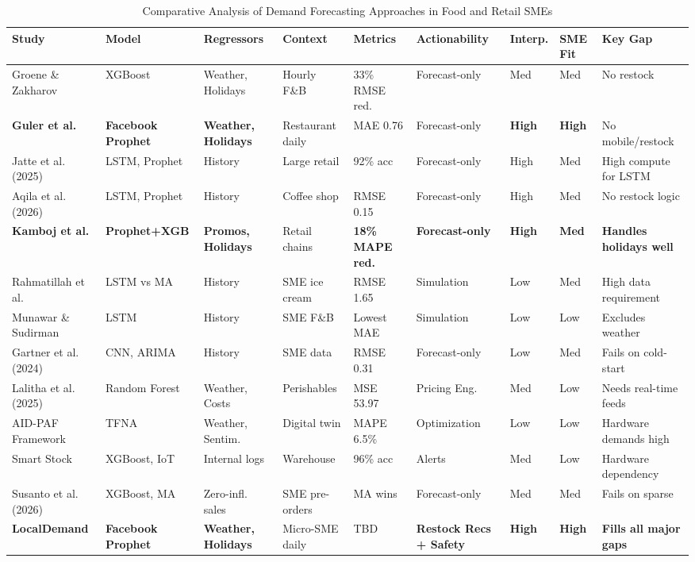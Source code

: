 \documentclass[conference]{IEEEtran}
\begin{document}
\begin{table}[t]
\centering
\footnotesize
\caption{Comparative Analysis of Demand Forecasting Approaches in Food and Retail SMEs}
\label{tab:comparative_analysis}
\begin{tabular}{@{}p{2.1cm}p{1.7cm}p{1.9cm}p{1.6cm}p{1.8cm}p{1.4cm}p{0.9cm}p{1cm}p{2.4cm}@{}}
\toprule
\textbf{Study} & \textbf{Model} & \textbf{Regressors} & \textbf{Context} & \textbf{Metrics} & \textbf{Actionability} & \textbf{Interp.} & \textbf{SME Fit} & \textbf{Key Gap} \\
\midrule
Groene \& Zakharov & XGBoost & Weather, Holidays & Hourly F\&B & 33\% RMSE red. & Forecast-only & Med & Med & No restock \\
\textbf{Guler et al.} & \textbf{Facebook Prophet} & \textbf{Weather, Holidays} & Restaurant daily & MAE 0.76 & Forecast-only & \textbf{High} & \textbf{High} & No mobile/restock \\
Jatte et al. (2025) & LSTM, Prophet & History & Large retail & 92\% acc & Forecast-only & High & Med & High compute for LSTM \\
Aqila et al. (2026) & LSTM, Prophet & History & Coffee shop & RMSE 0.15 & Forecast-only & High & Med & No restock logic \\
\textbf{Kamboj et al.} & \textbf{Prophet+XGB} & \textbf{Promos, Holidays} & Retail chains & \textbf{18\% MAPE red.} & \textbf{Forecast-only} & \textbf{High} & \textbf{Med} & \textbf{Handles holidays well} \\
Rahmatillah et al. & LSTM vs MA & History & SME ice cream & RMSE 1.65 & Simulation & Low & Med & High data requirement \\
Munawar \& Sudirman & LSTM & History & SME F\&B & Lowest MAE & Simulation & Low & Low & Excludes weather \\
Gartner et al. (2024)& CNN, ARIMA & History & SME data & RMSE 0.31 & Forecast-only & Low & Med & Fails on cold-start \\
Lalitha et al. (2025)& Random Forest & Weather, Costs & Perishables & MSE 53.97 & Pricing Eng. & Med & Low & Needs real-time feeds \\
AID-PAF Framework & TFNA & Weather, Sentim. & Digital twin & MAPE 6.5\% & Optimization & Low & Low & Hardware demands high \\
Smart Stock & XGBoost, IoT & Internal logs & Warehouse & 96\% acc & Alerts & Med & Low & Hardware dependency \\
Susanto et al. (2026)& XGBoost, MA & Zero-infl. sales & SME pre-orders & MA wins & Forecast-only & Med & Med & Fails on sparse \\
\midrule
\textbf{LocalDemand} & \textbf{Facebook Prophet} & \textbf{Weather, Holidays} & Micro-SME daily & TBD & \textbf{Restock Recs + Safety} & \textbf{High} & \textbf{High} & \textbf{Fills all major gaps} \\
\bottomrule
\end{tabular}
\end{table}
\end{document}
